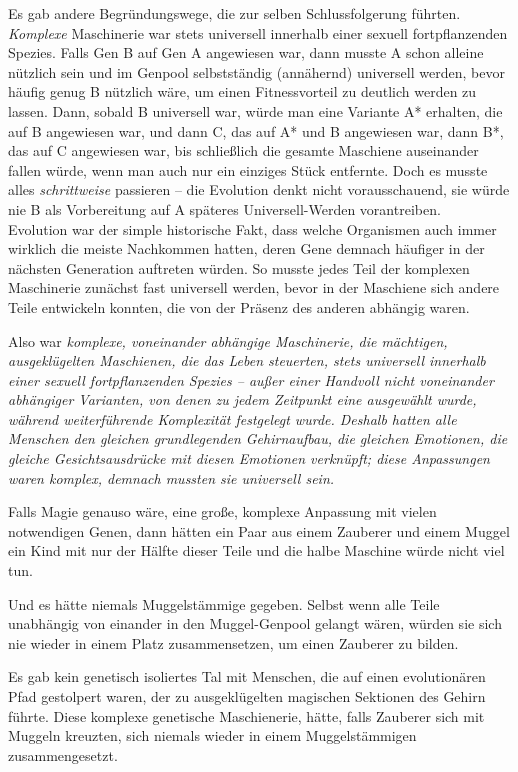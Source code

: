 {Es gab andere Begründungswege, die zur selben Schlussfolgerung führten. \emph{Komplexe} Maschinerie war stets universell innerhalb einer sexuell fortpflanzenden Spezies. Falls Gen B auf Gen A angewiesen war, dann musste A schon alleine nützlich sein und im Genpool selbstständig (annähernd) universell werden, bevor häufig genug B nützlich wäre, um einen Fitnessvorteil zu deutlich werden zu lassen. Dann, sobald B universell war, würde man eine Variante A* erhalten, die auf B angewiesen war, und dann C, das auf A* und B angewiesen war, dann B*, das auf C angewiesen war, bis schließlich die gesamte Maschiene auseinander fallen würde, wenn man auch nur ein einziges Stück entfernte. Doch es musste alles \emph{schrittweise} passieren -- die Evolution denkt nicht vorausschauend, sie würde nie B als Vorbereitung auf A späteres Universell-Werden vorantreiben.\\ Evolution war der simple historische Fakt, dass welche Organismen auch immer wirklich die meiste Nachkommen hatten, deren Gene demnach häufiger in der nächsten Generation auftreten würden. So musste jedes Teil der komplexen Maschinerie zunächst fast universell werden, bevor in der Maschiene sich andere Teile entwickeln konnten, die von der Präsenz des anderen abhängig waren.

Also war \emph{komplexe, voneinander abhängige Maschinerie, die mächtigen, ausgeklügelten Maschienen, die das Leben steuerten, stets \emph{universell} innerhalb einer sexuell fortpflanzenden Spezies -- außer einer Handvoll \emph{nicht} voneinander abhängiger \emph{Varianten}, von denen zu jedem Zeitpunkt eine ausgewählt wurde, während weiterführende Komplexität festgelegt wurde. Deshalb hatten alle Menschen den gleichen grundlegenden Gehirnaufbau, die gleichen Emotionen, die gleiche Gesichtsausdrücke mit diesen Emotionen verknüpft; diese Anpassungen waren komplex, demnach \emph{mussten} sie universell sein.}

Falls Magie genauso wäre, eine große, komplexe Anpassung mit vielen notwendigen Genen, dann hätten ein Paar aus einem Zauberer und einem Muggel ein Kind mit nur der Hälfte dieser Teile und die halbe Maschine würde nicht viel tun.

Und es hätte niemals Muggelstämmige gegeben. Selbst wenn alle Teile unabhängig von einander in den Muggel-Genpool gelangt wären, würden sie sich nie wieder in einem Platz zusammensetzen, um einen Zauberer zu bilden.

Es gab kein genetisch isoliertes Tal mit Menschen, die auf einen evolutionären Pfad gestolpert waren, der zu ausgeklügelten magischen Sektionen des Gehirn führte. Diese komplexe genetische Maschienerie, hätte, falls Zauberer sich mit Muggeln kreuzten, sich niemals wieder in einem Muggelstämmigen zusammengesetzt.

}

